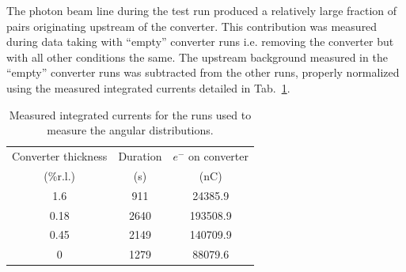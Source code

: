 The photon beam line during the test run produced a relatively large fraction of pairs 
originating upstream of the converter. This contribution was measured during data taking 
with ``empty'' converter runs i.e. removing the converter but with all other conditions 
the same. The upstream background measured in the ``empty'' converter runs was subtracted 
from the other runs, properly normalized using the measured integrated currents detailed in 
Tab.~\ref{tab:currents}.
\begin{table}
\centering
\begin{tabular}{|c|c|c|}
\hline
Converter thickness & Duration &  $e^-$ on converter \\
 (\%r.l.) & (s) & (nC)    \\   
\hline
1.6   & 911 &     24385.9     \\
0.18   & 2640 &    193508.9  \\
0.45  & 2149 &       140709.9  \\
0    & 1279  &   88079.6  \\
\hline
\end{tabular}
\caption{{\small Measured integrated currents for the runs used to measure the angular distributions.}}
\label{tab:currents}
\end{table}
